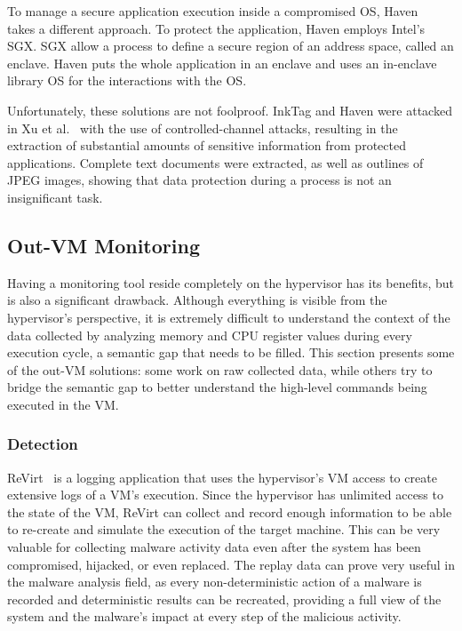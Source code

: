 \par To manage a secure application execution inside a compromised \ac{OS}, Haven~\cite{baumann2015shielding} takes a different approach. To protect the application, Haven employs Intel's \ac{SGX}. \ac{SGX} allow a process to define a secure region of an address space, called an enclave. Haven puts the whole application in an enclave and uses an in-enclave library \ac{OS} for the interactions with the \ac{OS}.

\par Unfortunately, these solutions are not foolproof. InkTag and Haven were attacked in Xu et al.~\cite{xu2015controlled} with the use of controlled-channel attacks, resulting in the extraction of substantial amounts of sensitive information from protected applications. Complete text documents were extracted, as well as outlines of JPEG images, showing that data protection during a process is not an insignificant task. 


\subsection{Out-\ac{VM} Monitoring}\label{sub:outvm}
Having a monitoring tool reside completely on the hypervisor has its benefits, but is also a significant drawback. Although everything is visible from the hypervisor's perspective, it is extremely difficult to understand the context of the data collected by analyzing memory and \ac{CPU} register values during every execution cycle, a semantic gap that needs to be filled. This section presents some of the out-\ac{VM} solutions: some work on raw collected data, while others try to bridge the semantic gap to better understand the high-level commands being executed in the \ac{VM}.

\subsubsection{Detection}

\par ReVirt~\cite{dunlap2002revirt} is a logging application that uses the hypervisor’s \ac{VM} access to create extensive logs of a \ac{VM}’s execution. Since the hypervisor has unlimited access to the state of the \ac{VM}, ReVirt can collect and record enough information to be able to re-create and simulate the execution of the target machine. This can be very valuable for collecting malware activity data even after the system has been compromised, hijacked, or even replaced. The replay data can prove very useful in the malware analysis field, as every non-deterministic action of a malware is recorded and deterministic results can be recreated, providing a full view of the system and the malware's impact at every step of the malicious activity.

